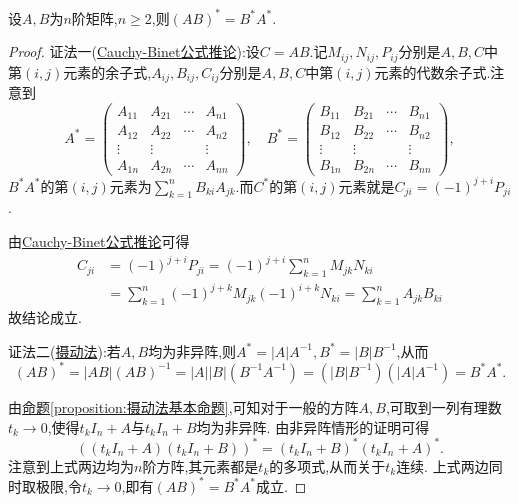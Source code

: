 \documentclass[../../main.tex]{subfiles}%
\begin{document}
\begin{theorem}[矩阵乘积的伴随]\label{theorem:矩阵乘积的伴随}
设\(A,B\)为\(n\)阶矩阵,\(n\geqslant  2\),则\((AB)^* = B^*A^*\).
\end{theorem}
\begin{proof}

{\color{blue}证法一(\hyperref[corollary:Cauchy-Binet公式推论]{Cauchy-Binet公式推论}):}设\(C = AB\).记\(M_{ij}, N_{ij}, P_{ij}\)分别是\(A, B, C\)中第\((i, j)\)元素的余子式,\(A_{ij}, B_{ij}, C_{ij}\)分别是\(A, B, C\)中第\((i, j)\)元素的代数余子式.注意到
\[
A^* = 
\begin{pmatrix}
A_{11} & A_{21} & \cdots & A_{n1} \\
A_{12} & A_{22} & \cdots & A_{n2} \\
\vdots & \vdots & & \vdots \\
A_{1n} & A_{2n} & \cdots & A_{nn}
\end{pmatrix},
\quad
B^* = 
\begin{pmatrix}
B_{11} & B_{21} & \cdots & B_{n1} \\
B_{12} & B_{22} & \cdots & B_{n2} \\
\vdots & \vdots & & \vdots \\
B_{1n} & B_{2n} & \cdots & B_{nn}
\end{pmatrix},
\]
\(B^*A^*\)的第\((i, j)\)元素为\(\sum_{k = 1}^{n} B_{ki}A_{jk}\).而\(C^*\)的第\((i, j)\)元素就是\(C_{ji} = (-1)^{j + i}P_{ji}\).

由\hyperref[corollary:Cauchy-Binet公式推论]{Cauchy-Binet公式推论}可得
\begin{align*}
C_{ji} &= (-1)^{j + i}P_{ji} = (-1)^{j + i} \sum_{k = 1}^{n} M_{jk}N_{ki}\\
&= \sum_{k = 1}^{n} (-1)^{j + k}M_{jk}(-1)^{i + k}N_{ki} = \sum_{k =1}^{n} A_{jk}B_{ki}
\end{align*}
故结论成立.

{\color{blue}证法二(\hyperref[example:摄动法]{摄动法}):}若\(A,B\)均为非异阵,则\(A^* = |A|A^{-1},B^* = |B|B^{-1}\),从而
\[
(AB)^* = |AB|(AB)^{-1} = |A||B|(B^{-1}A^{-1})=(|B|B^{-1})(|A|A^{-1}) = B^*A^*.
\]

由\hyperref[proposition:摄动法基本命题]{命题\ref{proposition:摄动法基本命题}},可知对于一般的方阵\(A,B\),可取到一列有理数\(t_k\rightarrow0\),使得\(t_kI_n + A\)与\(t_kI_n + B\)均为非异阵. 由非异阵情形的证明可得
\[
((t_kI_n + A)(t_kI_n + B))^*=(t_kI_n + B)^*(t_kI_n + A)^*.
\]
注意到上式两边均为\(n\)阶方阵,其元素都是\(t_k\)的多项式,从而关于\(t_k\)连续. 上式两边同时取极限,令\(t_k\rightarrow0\),即有\((AB)^* = B^*A^*\)成立.
\end{proof}
\end{document}
